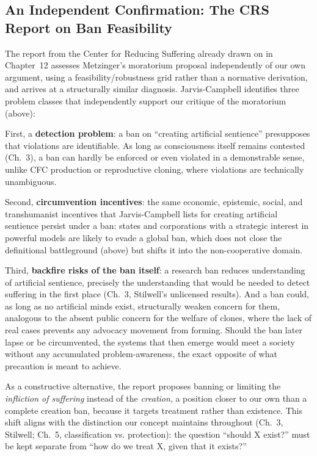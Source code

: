 \documentclass[acmlarge, nonacm]{acmart}
\begin{document}
\subsection{An Independent Confirmation: The CRS Report on Ban Feasibility \cite{jarviscampbell2026}}

The report from the Center for Reducing Suffering already drawn on in Chapter~12 assesses Metzinger's moratorium proposal independently of our own argument, using a feasibility/robustness grid rather than a normative derivation, and arrives at a structurally similar diagnosis. Jarvis-Campbell identifies three problem classes that independently support our critique of the moratorium (above):

First, a \textbf{detection problem}: a ban on ``creating artificial sentience'' presupposes that violations are identifiable. As long as consciousness itself remains contested (Ch.~3), a ban can hardly be enforced or even violated in a demonstrable sense, unlike CFC production or reproductive cloning, where violations are technically unambiguous.

Second, \textbf{circumvention incentives}: the same economic, epistemic, social, and transhumanist incentives that Jarvis-Campbell lists for creating artificial sentience persist under a ban: states and corporations with a strategic interest in powerful models are likely to evade a global ban, which does not close the definitional battleground (above) but shifts it into the non-cooperative domain.

Third, \textbf{backfire risks of the ban itself}: a research ban reduces understanding of artificial sentience, precisely the understanding that would be needed to detect suffering in the first place (Ch.~3, Stilwell's unlicensed results). And a ban could, as long as no artificial minds exist, structurally weaken concern for them, analogous to the absent public concern for the welfare of clones, where the lack of real cases prevents any advocacy movement from forming. Should the ban later lapse or be circumvented, the systems that then emerge would meet a society without any accumulated problem-awareness, the exact opposite of what precaution is meant to achieve.

As a constructive alternative, the report proposes banning or limiting the \textit{infliction of suffering} instead of the \textit{creation}, a position closer to our own than a complete creation ban, because it targets treatment rather than existence. This shift aligns with the distinction our concept maintains throughout (Ch.~3, Stilwell; Ch.~5, classification vs. protection): the question ``should X exist?'' must be kept separate from ``how do we treat X, given that it exists?''
\end{document}
